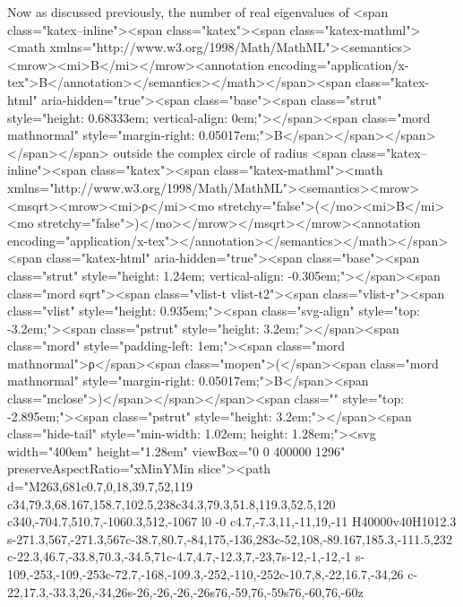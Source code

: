 Now as discussed previously, the number of real eigenvalues of <span class="katex--inline"><span class="katex"><span class="katex-mathml"><math xmlns="http://www.w3.org/1998/Math/MathML"><semantics><mrow><mi>B</mi></mrow><annotation encoding="application/x-tex">B</annotation></semantics></math></span><span class="katex-html" aria-hidden="true"><span class="base"><span class="strut" style="height: 0.68333em; vertical-align: 0em;"></span><span class="mord mathnormal" style="margin-right: 0.05017em;">B</span></span></span></span></span> outside the complex circle of radius <span class="katex--inline"><span class="katex"><span class="katex-mathml"><math xmlns="http://www.w3.org/1998/Math/MathML"><semantics><mrow><msqrt><mrow><mi>ρ</mi><mo stretchy="false">(</mo><mi>B</mi><mo stretchy="false">)</mo></mrow></msqrt></mrow><annotation encoding="application/x-tex"></annotation></semantics></math></span><span class="katex-html" aria-hidden="true"><span class="base"><span class="strut" style="height: 1.24em; vertical-align: -0.305em;"></span><span class="mord sqrt"><span class="vlist-t vlist-t2"><span class="vlist-r"><span class="vlist" style="height: 0.935em;"><span class="svg-align" style="top: -3.2em;"><span class="pstrut" style="height: 3.2em;"></span><span class="mord" style="padding-left: 1em;"><span class="mord mathnormal">ρ</span><span class="mopen">(</span><span class="mord mathnormal" style="margin-right: 0.05017em;">B</span><span class="mclose">)</span></span></span><span class="" style="top: -2.895em;"><span class="pstrut" style="height: 3.2em;"></span><span class="hide-tail" style="min-width: 1.02em; height: 1.28em;"><svg width="400em" height="1.28em" viewBox="0 0 400000 1296" preserveAspectRatio="xMinYMin slice"><path d="M263,681c0.7,0,18,39.7,52,119
c34,79.3,68.167,158.7,102.5,238c34.3,79.3,51.8,119.3,52.5,120
c340,-704.7,510.7,-1060.3,512,-1067
l0 -0
c4.7,-7.3,11,-11,19,-11
H40000v40H1012.3
s-271.3,567,-271.3,567c-38.7,80.7,-84,175,-136,283c-52,108,-89.167,185.3,-111.5,232
c-22.3,46.7,-33.8,70.3,-34.5,71c-4.7,4.7,-12.3,7,-23,7s-12,-1,-12,-1
s-109,-253,-109,-253c-72.7,-168,-109.3,-252,-110,-252c-10.7,8,-22,16.7,-34,26
c-22,17.3,-33.3,26,-34,26s-26,-26,-26,-26s76,-59,76,-59s76,-60,76,-60z
